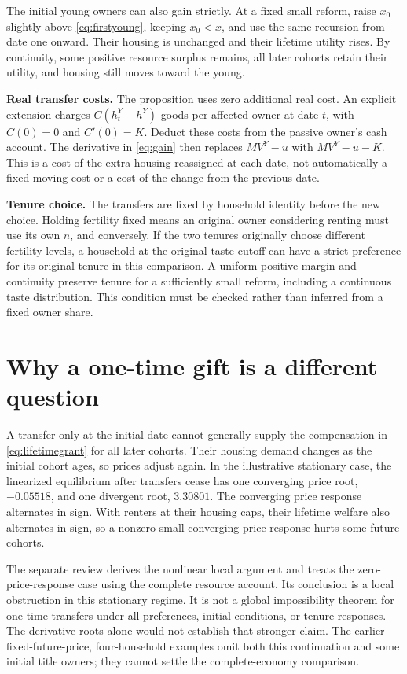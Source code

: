 \documentclass[11pt]{article}
\begin{document}
The initial young owners can also gain strictly. At a fixed small reform,
raise $x_0$ slightly above \eqref{eq:firstyoung}, keeping $x_0<x$, and use the
same recursion from date one onward. Their housing is unchanged and their
lifetime utility rises. By continuity, some positive resource surplus remains,
all later cohorts retain their utility, and housing still moves toward the young.

\textbf{Real transfer costs.} The proposition uses zero additional real cost.
An explicit extension charges $C(h_t^Y-h^Y)$ goods per affected owner at date
$t$, with $C(0)=0$ and $C'(0)=K$. Deduct these costs from the passive owner's
cash account. The derivative in \eqref{eq:gain} then replaces $MV^Y-u$ with
$MV^Y-u-K$. This is a cost of the extra housing reassigned at each date, not
automatically a fixed moving cost or a cost of the change from the previous date.

\textbf{Tenure choice.} The transfers are fixed by household identity before
the new choice. Holding fertility fixed means an original owner considering
renting must use its own $n$, and conversely. If the two tenures originally
choose different fertility levels, a household at the original taste cutoff
can have a strict preference for its original tenure in this comparison.
A uniform positive margin and continuity preserve tenure for a sufficiently
small reform, including a continuous taste distribution. This condition must
be checked rather than inferred from a fixed owner share.

\section{Why a one-time gift is a different question}

A transfer only at the initial date cannot generally supply the compensation
in \eqref{eq:lifetimegrant} for all later cohorts. Their housing demand changes
as the initial cohort ages, so prices adjust again. In the illustrative
stationary case, the linearized equilibrium after transfers cease has one
converging price root, $-0.05518$, and one divergent root, $3.30801$. The
converging price response alternates in sign. With renters at their housing
caps, their lifetime welfare also alternates in sign, so a nonzero small
converging price response hurts some future cohorts.

The separate review derives the nonlinear local argument and treats the
zero-price-response case using the complete resource account. Its conclusion
is a local obstruction in this stationary regime. It is not a global
impossibility theorem for one-time transfers under all preferences, initial
conditions, or tenure responses. The derivative roots alone would not establish
that stronger claim. The earlier fixed-future-price, four-household examples
omit both this continuation and some initial title owners; they cannot settle
the complete-economy comparison.
\end{document}
